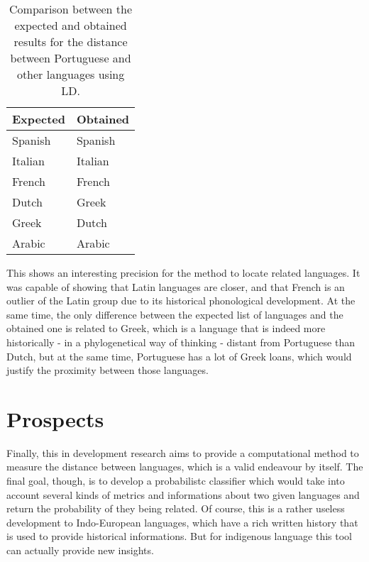 \documentclass[runningheads]{llncs}
\begin{document}
\begin{table}[H]
	\centering
	\caption{Comparison between the expected and obtained results for the distance between Portuguese and other languages using LD.}
	\label{my-label}
	\begin{tabular}{@{}l|l@{}}
		\textbf{Expected} & \textbf{Obtained} \\ \midrule
		Spanish             & Spanish           \\
		Italian             & Italian            \\
		French              & French           \\
		Dutch             & Greek            \\
		Greek                & Dutch           \\
		Arabic                & Arabic             
	\end{tabular}
\end{table}

This shows an interesting precision for the method to locate related languages. It was capable of showing that Latin languages are closer, and that French is an outlier of the Latin group due to its historical phonological development. At the same time, the only difference between the expected list of languages and the obtained one is related to Greek, which is a language that is indeed more historically - in a phylogenetical way of thinking -  distant from Portuguese than Dutch, but at the same time, Portuguese has a lot of Greek loans, which would justify the proximity between those languages.\\

\section{Prospects}

Finally, this in development research aims to provide a computational method to measure the distance between languages, which is a valid endeavour by itself. The final goal, though, is to develop a probabilistc classifier which would take into account several kinds of metrics and informations about two given languages and return the probability of they being related. Of course, this is a rather useless development to Indo-European languages, which have a rich written history that is used to provide historical informations. But for indigenous language this tool can actually provide new insights.\\

%
%
%
% 
% 
%



\end{document}
